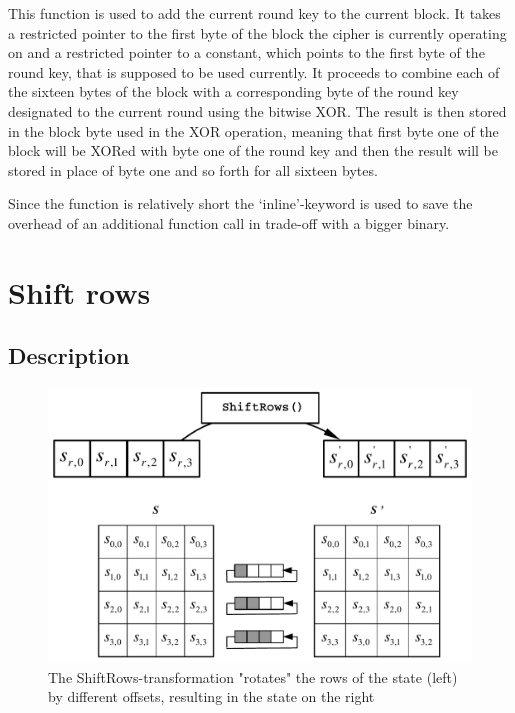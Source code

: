 This function is used to add the current round key to the current block.
It takes a restricted pointer to the first byte of the block the cipher
is currently operating on and a restricted pointer to a constant, which
points to the first byte of the round key, that is supposed to be used
currently. It proceeds to combine each of the sixteen bytes of the block
with a corresponding byte of the round key designated to the current
round using the bitwise XOR. The result is then stored in the block byte
used in the XOR operation, meaning that first byte one of the block will
be XORed with byte one of the round key and then the result will be
stored in place of byte one and so forth for all sixteen bytes.

Since the function is relatively short the `inline'-keyword is used to
save the overhead of an additional function call in trade-off with a
bigger binary.

\hypertarget{shift-rows}{%
\section{Shift rows}\label{shift-rows}}

\hypertarget{description-3}{%
\subsection{Description}\label{description-3}}

\begin{figure}
\centering
\includegraphics[scale = 0.3]{data/figures/shiftrows.png}
\caption{The ShiftRows-transformation "rotates" the rows of the state (left) by different offsets, resulting in the state on the right \cite[ch. 5.1.2]{aes2001}}
\end{figure}

